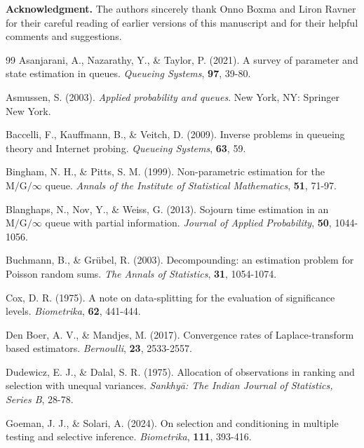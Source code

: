 \documentclass[12pt]{article}
\newcommand{\1}{\mathbf{1}}
\begin{document}
\medskip
\noindent\textbf{Acknowledgment.}
The authors sincerely thank Onno Boxma and Liron Ravner for their careful reading of earlier versions of this manuscript and for their helpful comments and suggestions.
\begin{thebibliography}{99}
Asanjarani, A., Nazarathy, Y., \& Taylor, P. (2021). A survey of parameter and state estimation in queues. \textit{Queueing Systems}, \textbf{97}, 39-80.

Asmussen, S. (2003). \textit{Applied probability and queues}. New York, NY: Springer New York.

Baccelli, F., Kauffmann, B., \& Veitch, D. (2009). Inverse problems in queueing theory and Internet probing. \textit{Queueing Systems}, \textbf{63}, 59.

Bingham, N. H., \& Pitts, S. M. (1999). Non-parametric estimation for the $\text{M/G/}\infty$ queue. \textit{Annals of the Institute of Statistical Mathematics}, \textbf{51}, 71-97.

Blanghaps, N., Nov, Y., \& Weiss, G. (2013). Sojourn time estimation in an $\text{M/G/}\infty$ queue with partial information. \textit{Journal of Applied Probability}, \textbf{50}, 1044-1056.

Buchmann, B., \& Gr\"ubel, R. (2003). Decompounding: an estimation problem for Poisson random sums. \textit{The Annals of Statistics}, \textbf{31}, 1054-1074.

Cox, D. R. (1975). A note on data-splitting for the evaluation of significance levels. \textit{Biometrika}, \textbf{62}, 441-444.

Den Boer, A. V., \& Mandjes, M. (2017). Convergence rates of Laplace-transform based estimators. \textit{Bernoulli}, \textbf{23}, 2533-2557.

Dudewicz, E. J., \& Dalal, S. R. (1975). Allocation of observations in ranking and selection with unequal variances. \textit{Sankhy{\=a}: The Indian Journal of Statistics, Series B}, 28-78.

Goeman, J. J., \& Solari, A. (2024). On selection and conditioning in multiple testing and selective inference. \textit{Biometrika}, \textbf{111}, 393-416.


\end{thebibliography}
\end{document}
